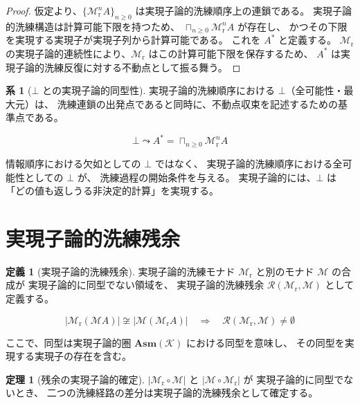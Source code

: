 \documentclass[11pt,a4paper]{article}
\theoremstyle{definition}
\newtheorem{definition}{定義}[section]
\newtheorem{theorem}{定理}[section]
\newtheorem{corollary}{系}[section]
\newcommand{\Mr}{\mathcal{M}_{\mathrm{r}}}
\DeclareMathOperator*{\bigsqcap}{\sqcap}
\newcommand{\Asm}{\mathbf{Asm}}
\begin{document}
\begin{proof}
仮定より、$\{\Mr^n A\}_{n\geq 0}$ は実現子論的洗練順序上の連鎖である。
実現子論的洗練構造は計算可能下限を持つため、
$\bigsqcap_{n\geq 0}\Mr^n A$ が存在し、
かつその下限を実現する実現子が実現子列から計算可能である。
これを $A^*$ と定義する。
$\Mr$ の実現子論的連続性により、$\Mr$ はこの計算可能下限を保存するため、
$A^*$ は実現子論的洗練反復に対する不動点として振る舞う。
\end{proof}

\begin{corollary}[$\bot$ との実現子論的同型性]
実現子論的洗練順序における $\bot$（全可能性・最大元）は、
洗練連鎖の出発点であると同時に、不動点収束を記述するための基準点である。

\begin{equation}
\bot \leadsto A^* = \bigsqcap_{n\geq 0}\Mr^n A
\end{equation}

情報順序における欠如としての $\bot$ ではなく、
実現子論的洗練順序における全可能性としての $\bot$ が、
洗練過程の開始条件を与える。
実現子論的には、$\bot$ は「どの値も返しうる非決定的計算」を実現する。
\end{corollary}

\section{実現子論的洗練残余}
\label{sec:residue}

\begin{definition}[実現子論的洗練残余]
実現子論的洗練モナド $\Mr$ と別のモナド $\mathcal{M}$ の合成が
実現子論的に同型でない領域を、
実現子論的洗練残余 $\mathcal{R}(\Mr,\mathcal{M})$ として定義する。

\begin{equation}
|\Mr(\mathcal{M}A)| \not\cong |\mathcal{M}(\Mr A)|
\quad\Rightarrow\quad
\mathcal{R}(\Mr,\mathcal{M}) \neq \emptyset
\end{equation}

ここで、同型は実現子論的圏 $\Asm(\mathcal{K})$ における同型を意味し、
その同型を実現する実現子の存在を含む。
\end{definition}

\begin{theorem}[残余の実現子論的確定]
$|\Mr\circ\mathcal{M}|$ と $|\mathcal{M}\circ\Mr|$ が
実現子論的に同型でないとき、
二つの洗練経路の差分は実現子論的洗練残余として確定する。
\end{theorem}
\end{document}
